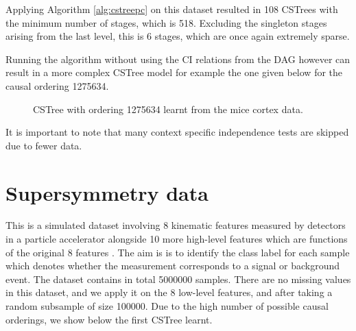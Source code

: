 \documentclass{tufte-book}
\begin{document}
Applying Algorithm \ref{alg:cstreepc} on this dataset resulted in 108 CSTrees with the minimum number of stages, which is 518. Excluding the singleton stages arising from the last level, this is 6 stages, which are once again extremely sparse.


Running the algorithm without using the CI relations from the DAG however can result in a more complex CSTree model for example the one given below for the causal ordering 1275634.

\begin{figure}[!h]\label{fig:mice1}
   \begin{floatrow}
%
\caption{CSTree with ordering 1275634 learnt from the mice cortex data.}
        
   \end{floatrow}
\end{figure}


It is important to note that many context specific independence tests are skipped due to fewer data.



\section{Supersymmetry data}
\label{sec:org338535c}

This is a simulated dataset involving 8 kinematic features measured by detectors in a particle accelerator alongside 10 more high-level features which are functions of the original 8 features \cite{baldi-2014-searc-exotic}. The aim is is to identify the class label for each sample which denotes whether the measurement corresponds to a signal or background event. The dataset contains in total 5000000 samples. There are no missing values in this dataset, and we apply it on the 8 low-level features, and after taking a random subsample of size 100000. Due to the high number of possible causal orderings, we show below the first CSTree learnt.
\end{document}
